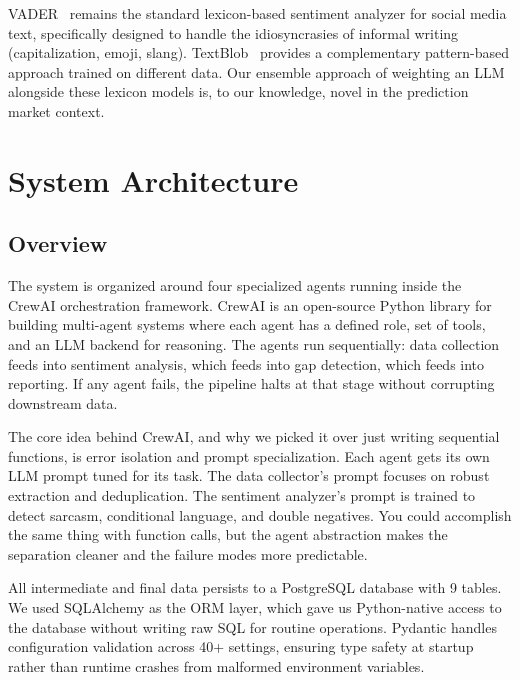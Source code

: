 \documentclass[conference]{IEEEtran}
\begin{document}
VADER~\cite{hutto2014} remains the standard lexicon-based sentiment analyzer for social media text, specifically designed to handle the idiosyncrasies of informal writing (capitalization, emoji, slang). TextBlob~\cite{loria2020} provides a complementary pattern-based approach trained on different data. Our ensemble approach of weighting an LLM alongside these lexicon models is, to our knowledge, novel in the prediction market context.

\section{System Architecture}

\subsection{Overview}

The system is organized around four specialized agents running inside the CrewAI orchestration framework. CrewAI is an open-source Python library for building multi-agent systems where each agent has a defined role, set of tools, and an LLM backend for reasoning. The agents run sequentially: data collection feeds into sentiment analysis, which feeds into gap detection, which feeds into reporting. If any agent fails, the pipeline halts at that stage without corrupting downstream data.

The core idea behind CrewAI, and why we picked it over just writing sequential functions, is error isolation and prompt specialization. Each agent gets its own LLM prompt tuned for its task. The data collector's prompt focuses on robust extraction and deduplication. The sentiment analyzer's prompt is trained to detect sarcasm, conditional language, and double negatives. You could accomplish the same thing with function calls, but the agent abstraction makes the separation cleaner and the failure modes more predictable.

All intermediate and final data persists to a PostgreSQL database with 9 tables. We used SQLAlchemy as the ORM layer, which gave us Python-native access to the database without writing raw SQL for routine operations. Pydantic handles configuration validation across 40+ settings, ensuring type safety at startup rather than runtime crashes from malformed environment variables.
\end{document}
